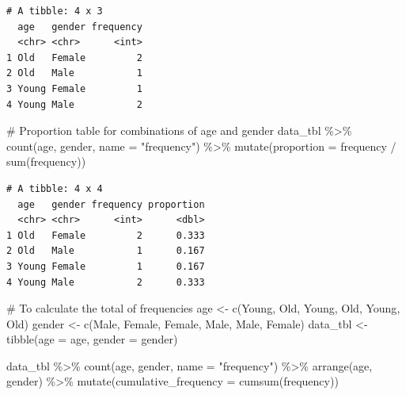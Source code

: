 \documentclass[
  man,
  floatsintext,
  longtable,
  nolmodern,
  notxfonts,
  notimes,
  colorlinks=true,linkcolor=blue,citecolor=blue,urlcolor=blue]{apa7}
\newenvironment{Shaded}{\begin{snugshade}}{\end{snugshade}}
\newcommand{\AttributeTok}[1]{\textcolor[rgb]{0.40,0.45,0.13}{#1}}
\newcommand{\CommentTok}[1]{\textcolor[rgb]{0.37,0.37,0.37}{#1}}
\newcommand{\FunctionTok}[1]{\textcolor[rgb]{0.28,0.35,0.67}{#1}}
\newcommand{\NormalTok}[1]{\textcolor[rgb]{0.00,0.23,0.31}{#1}}
\newcommand{\OtherTok}[1]{\textcolor[rgb]{0.00,0.23,0.31}{#1}}
\newcommand{\SpecialCharTok}[1]{\textcolor[rgb]{0.37,0.37,0.37}{#1}}
\newcommand{\StringTok}[1]{\textcolor[rgb]{0.13,0.47,0.30}{#1}}
\begin{document}
\begin{verbatim}
# A tibble: 4 x 3
  age   gender frequency
  <chr> <chr>      <int>
1 Old   Female         2
2 Old   Male           1
3 Young Female         1
4 Young Male           2
\end{verbatim}

\begin{Shaded}
\begin{Highlighting}[]
\CommentTok{\# Proportion table for combinations of age and gender}
\NormalTok{data\_tbl }\SpecialCharTok{\%\textgreater{}\%}
  \FunctionTok{count}\NormalTok{(age, gender, }\AttributeTok{name =} \StringTok{"frequency"}\NormalTok{) }\SpecialCharTok{\%\textgreater{}\%}
  \FunctionTok{mutate}\NormalTok{(}\AttributeTok{proportion =}\NormalTok{ frequency }\SpecialCharTok{/} \FunctionTok{sum}\NormalTok{(frequency))}
\end{Highlighting}
\end{Shaded}

\begin{verbatim}
# A tibble: 4 x 4
  age   gender frequency proportion
  <chr> <chr>      <int>      <dbl>
1 Old   Female         2      0.333
2 Old   Male           1      0.167
3 Young Female         1      0.167
4 Young Male           2      0.333
\end{verbatim}

\begin{Shaded}
\begin{Highlighting}[]
\CommentTok{\# To calculate the total of frequencies}
\NormalTok{age }\OtherTok{\textless{}{-}} \FunctionTok{c}\NormalTok{(}\StringTok{\textquotesingle{}Young\textquotesingle{}}\NormalTok{, }\StringTok{\textquotesingle{}Old\textquotesingle{}}\NormalTok{, }\StringTok{\textquotesingle{}Young\textquotesingle{}}\NormalTok{, }\StringTok{\textquotesingle{}Old\textquotesingle{}}\NormalTok{, }\StringTok{\textquotesingle{}Young\textquotesingle{}}\NormalTok{, }\StringTok{\textquotesingle{}Old\textquotesingle{}}\NormalTok{)}
\NormalTok{gender }\OtherTok{\textless{}{-}} \FunctionTok{c}\NormalTok{(}\StringTok{\textquotesingle{}Male\textquotesingle{}}\NormalTok{, }\StringTok{\textquotesingle{}Female\textquotesingle{}}\NormalTok{, }\StringTok{\textquotesingle{}Female\textquotesingle{}}\NormalTok{, }\StringTok{\textquotesingle{}Male\textquotesingle{}}\NormalTok{, }\StringTok{\textquotesingle{}Male\textquotesingle{}}\NormalTok{, }\StringTok{\textquotesingle{}Female\textquotesingle{}}\NormalTok{)}
\NormalTok{data\_tbl }\OtherTok{\textless{}{-}} \FunctionTok{tibble}\NormalTok{(}\AttributeTok{age =}\NormalTok{ age, }\AttributeTok{gender =}\NormalTok{ gender)}

\NormalTok{data\_tbl }\SpecialCharTok{\%\textgreater{}\%}
  \FunctionTok{count}\NormalTok{(age, gender, }\AttributeTok{name =} \StringTok{"frequency"}\NormalTok{) }\SpecialCharTok{\%\textgreater{}\%}
  \FunctionTok{arrange}\NormalTok{(age, gender) }\SpecialCharTok{\%\textgreater{}\%}
  \FunctionTok{mutate}\NormalTok{(}\AttributeTok{cumulative\_frequency =} \FunctionTok{cumsum}\NormalTok{(frequency))}
\end{Highlighting}
\end{Shaded}
\end{document}
